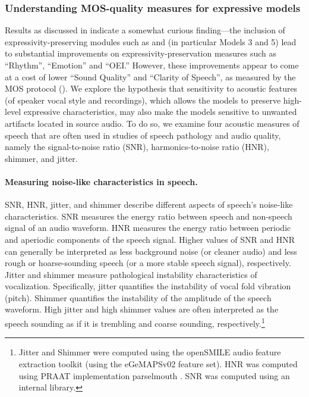 \subsubsection{Understanding MOS-quality measures for expressive models}
\label{sec:p2v_sensitivity}
Results as discussed in  indicate a somewhat curious finding—the inclusion of expressivity-preserving modules such as \ptv and \prosodyunitytwo (in particular Models 3 and 5) lead to substantial improvements on expressivity-preservation measures such as ``Rhythm'', ``Emotion'' and ``OEI.'' However, these improvements appear to come at a cost of lower ``Sound Quality'' and ``Clarity of Speech'', as measured by the MOS protocol (). We explore the hypothesis that sensitivity to acoustic features (of speaker vocal style and recordings), which allows the models to preserve high-level expressive characteristics, may also make the models sensitive to unwanted artifacts located in source audio. To do so, we examine four acoustic measures of speech that are often used in studies of speech pathology and audio quality, namely the signal-to-noise ratio (SNR), harmonics-to-noise ratio (HNR), shimmer, and jitter.

\paragraph{Measuring noise-like characteristics in speech.} SNR, HNR, jitter, and shimmer describe different aspects of speech's noise-like characteristics. SNR measures the energy ratio between speech and non-speech signal of an audio waveform. HNR measures the energy ratio between periodic and aperiodic components of the speech signal. Higher values of SNR and HNR can generally be interpreted as less background noise (or cleaner audio) and less rough or hoarse-sounding speech (or a more stable speech signal), respectively. Jitter and shimmer measure pathological instability characteristics of vocalization. Specifically, jitter quantifies the instability of vocal fold vibration (pitch). Shimmer quantifies the instability of the amplitude of the speech waveform. High jitter and high shimmer values are often interpreted as the speech sounding as if it is trembling and coarse sounding, respectively.\footnote{Jitter and Shimmer were computed using the openSMILE audio feature extraction toolkit \citep{opensmile} (using the eGeMAPSv02 feature set). HNR was computed using PRAAT implementation parselmouth \citep{parselmouth}. SNR was computed using an internal library.}

